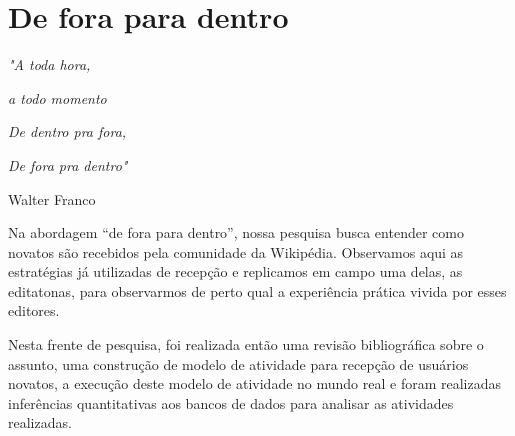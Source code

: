 \chapter{De fora para dentro}

\singlespacing
\begin{flushright}
\textit{"A toda hora,}

\textit{a todo momento}

\textit{De dentro pra fora,}

\textit{De fora pra dentro"}

Walter Franco
\end{flushright}
\doublespacing

Na abordagem ``de fora para dentro'', nossa pesquisa busca entender como novatos são recebidos pela comunidade da Wikipédia. Observamos aqui as estratégias já utilizadas de recepção e replicamos em campo uma delas, as editatonas, para observarmos de perto qual a experiência prática vivida por esses editores.

Nesta frente de pesquisa, foi realizada então uma revisão bibliográfica sobre o assunto, uma construção de modelo de atividade para recepção de usuários novatos, a execução deste modelo de atividade no mundo real e foram realizadas inferências quantitativas aos bancos de dados para analisar as atividades realizadas.



